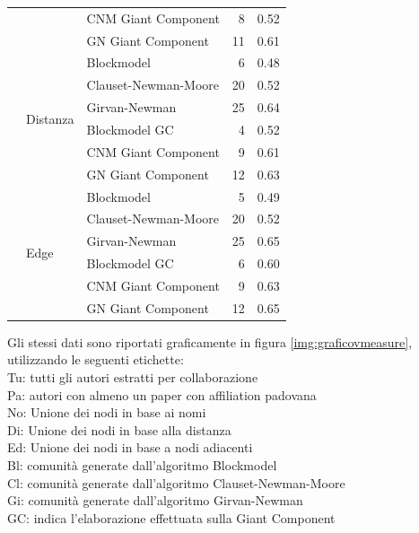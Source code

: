 \documentclass[12pt,a4paper,twoside]{report}
\begin{document}
{\begin{center}
\begin{longtable}{ |l|l|l|r|r| }
        &&CNM Giant Component  &8&0.52\\
        &&GN Giant Component  &11&0.61\\
    \cline{2-5}
        &
        \multirow{6}{4em}{Distanza}
        &Blockmodel &6&0.48\\
        &&Clauset-Newman-Moore &20&0.52\\
        &&Girvan-Newman &25&0.64\\
        &&Blockmodel GC  &4&0.52\\
        &&CNM Giant Component  &9&0.61\\
        &&GN Giant Component  &12&0.63\\
    \cline{2-5}
        &
        \multirow{6}{4em}{Edge}
        &Blockmodel &5&0.49\\
        &&Clauset-Newman-Moore &20&0.52\\
        &&Girvan-Newman &25&0.65\\
        &&Blockmodel GC  &6&0.60\\
        &&CNM Giant Component  &9&0.63\\
        &&GN Giant Component  &12&0.65\\
    \hline
\end{longtable}
\end{center}
}

Gli stessi dati sono riportati graficamente in figura \ref{img:graficovmeasure}, utilizzando le
seguenti etichette:\\
Tu: tutti gli autori estratti per collaborazione\\
Pa: autori con almeno un paper con affiliation padovana\\
No: Unione dei nodi in base ai nomi\\
Di: Unione dei nodi in base alla distanza\\
Ed: Unione dei nodi in base a nodi adiacenti\\
Bl: comunità generate dall'algoritmo Blockmodel\\
Cl: comunità generate dall'algoritmo Clauset-Newman-Moore\\
Gi: comunità generate dall'algoritmo Girvan-Newman\\
GC: indica l'elaborazione effettuata sulla Giant Component
\end{document}

